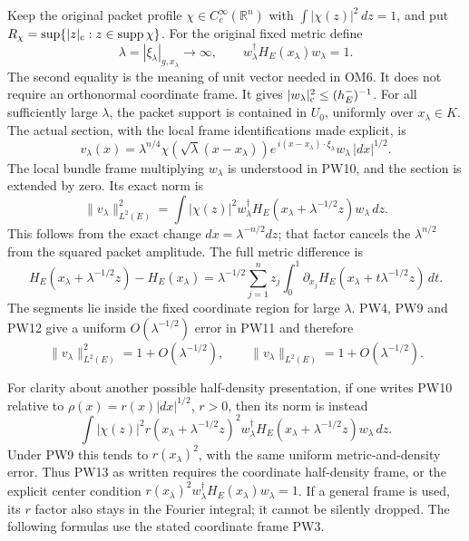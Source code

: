 \documentclass[
  11pt,
]{article}
\begin{document}
Keep the original packet profile \(\chi\in C_c^\infty(\mathbb R^n)\)
with \(\int|\chi(z)|^2\,dz=1\), and put
\(R_\chi=\sup\{|z|_{\rm c}:z\in\operatorname{supp}\chi\}\). For the
original fixed metric define \[
 \lambda=|\xi_\lambda|_{g,x_\lambda}\longrightarrow\infty,
 \qquad w_\lambda^\dagger H_E(x_\lambda)w_\lambda=1.
 \tag{PW9}
\] The second equality is the meaning of unit vector needed in OM6. It
does not require an orthonormal coordinate frame. It gives
\(|w_\lambda|_{\rm c}^2\leq(h_E^-)^{-1}\). For all sufficiently large
\(\lambda\), the packet support is contained in \(U_0\), uniformly over
\(x_\lambda\in K\). The actual section, with the local frame
identifications made explicit, is \[
 v_\lambda(x)=
  \lambda^{n/4}\chi\!\left(\sqrt\lambda(x-x_\lambda)\right)
  e^{\,i(x-x_\lambda)\cdot\xi_\lambda}
  w_\lambda\,|dx|^{1/2}.
 \tag{PW10}
\] The local bundle frame multiplying \(w_\lambda\) is understood in
PW10, and the section is extended by zero. Its exact norm is \[
 \|v_\lambda\|_{L^2(E)}^2
 =\int|\chi(z)|^2
 w_\lambda^\dagger
 H_E(x_\lambda+\lambda^{-1/2}z)w_\lambda\,dz .
 \tag{PW11}
\] This follows from the exact change \(dx=\lambda^{-n/2}dz\); that
factor cancels the \(\lambda^{n/2}\) from the squared packet amplitude.
The full metric difference is \[
 H_E(x_\lambda+\lambda^{-1/2}z)-H_E(x_\lambda)
 =\lambda^{-1/2}\sum_{j=1}^n z_j
       \int_0^1\partial_{x_j}H_E
          (x_\lambda+t\lambda^{-1/2}z)\,dt .
 \tag{PW12}
\] The segments lie inside the fixed coordinate region for large
\(\lambda\). PW4, PW9 and PW12 give a uniform \(O(\lambda^{-1/2})\)
error in PW11 and therefore \[
 \|v_\lambda\|_{L^2(E)}^2=1+O(\lambda^{-1/2}),
 \qquad \|v_\lambda\|_{L^2(E)}=1+O(\lambda^{-1/2}).
 \tag{PW13}
\]

For clarity about another possible half-density presentation, if one
writes PW10 relative to \(\rho(x)=r(x)|dx|^{1/2}\), \(r>0\), then its
norm is instead \[
 \int|\chi(z)|^2r(x_\lambda+\lambda^{-1/2}z)^2
  w_\lambda^\dagger H_E(x_\lambda+\lambda^{-1/2}z)w_\lambda\,dz .
 \tag{PW14}
\] Under PW9 this tends to \(r(x_\lambda)^2\), with the same uniform
metric-and-density error. Thus PW13 as written requires the coordinate
half-density frame, or the explicit center condition
\(r(x_\lambda)^2 w_\lambda^\dagger H_E(x_\lambda)w_\lambda=1\). If a
general frame is used, its \(r\) factor also stays in the Fourier
integral; it cannot be silently dropped. The following formulas use the
stated coordinate frame PW3.
\end{document}
